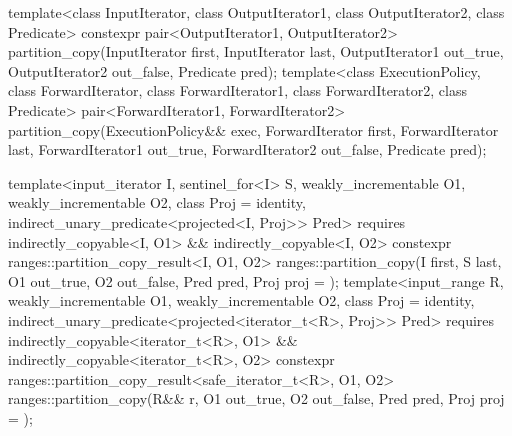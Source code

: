 %
\begin{itemdecl}
template<class InputIterator, class OutputIterator1,
         class OutputIterator2, class Predicate>
  constexpr pair<OutputIterator1, OutputIterator2>
    partition_copy(InputIterator first, InputIterator last,
                   OutputIterator1 out_true, OutputIterator2 out_false, Predicate pred);
template<class ExecutionPolicy, class ForwardIterator, class ForwardIterator1,
         class ForwardIterator2, class Predicate>
  pair<ForwardIterator1, ForwardIterator2>
    partition_copy(ExecutionPolicy&& exec,
                   ForwardIterator first, ForwardIterator last,
                   ForwardIterator1 out_true, ForwardIterator2 out_false, Predicate pred);

template<input_iterator I, sentinel_for<I> S, weakly_incrementable O1, weakly_incrementable O2,
         class Proj = identity, indirect_unary_predicate<projected<I, Proj>> Pred>
  requires indirectly_copyable<I, O1> && indirectly_copyable<I, O2>
  constexpr ranges::partition_copy_result<I, O1, O2>
    ranges::partition_copy(I first, S last, O1 out_true, O2 out_false, Pred pred,
                           Proj proj = {});
template<input_range R, weakly_incrementable O1, weakly_incrementable O2,
         class Proj = identity,
         indirect_unary_predicate<projected<iterator_t<R>, Proj>> Pred>
  requires indirectly_copyable<iterator_t<R>, O1> &&
           indirectly_copyable<iterator_t<R>, O2>
  constexpr ranges::partition_copy_result<safe_iterator_t<R>, O1, O2>
    ranges::partition_copy(R&& r, O1 out_true, O2 out_false, Pred pred, Proj proj = {});
\end{itemdecl}


